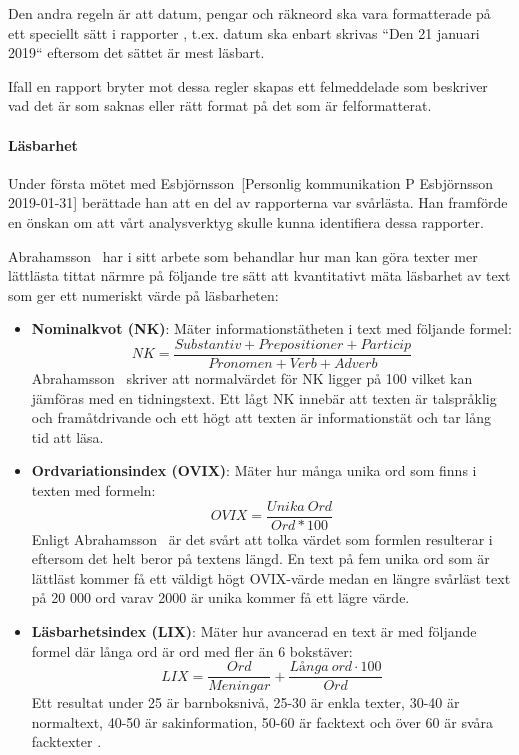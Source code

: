 \documentclass[swedish]{maucsthesis}
\begin{document}
Den andra regeln är att datum, pengar och räkneord ska vara formatterade på
ett speciellt sätt i rapporter \cite{rfsip}, t.ex. datum ska enbart 
skrivas ``Den 21 januari 2019`` eftersom det sättet är mest läsbart.

Ifall en rapport bryter mot dessa regler skapas ett felmeddelade som beskriver
vad det är som saknas eller rätt format på det som är felformatterat.

\paragraph*{Läsbarhet}\label{läsbarhet}

Under första mötet med Esbjörnsson~[Personlig kommunikation P Esbjörnsson 2019-01-31] berättade han att en del av
rapporterna var svårlästa. Han framförde en önskan om att vårt analysverktyg
skulle kunna identifiera dessa rapporter.

Abrahamsson~\cite{abrahamsson:2011} har i sitt arbete som behandlar hur man kan göra texter
mer lättlästa tittat närmre på följande tre sätt att kvantitativt mäta läsbarhet
av text som ger ett numeriskt värde på läsbarheten:

\begin{itemize}
\item \textbf{Nominalkvot (NK)}: Mäter informationstätheten i text med följande
  formel: $$NK=\frac{Substantiv + Prepositioner + Particip} {Pronomen + Verb + Adverb}$$
  Abrahamsson~\cite{abrahamsson:2011} skriver att normalvärdet för NK ligger på 100 vilket
  kan jämföras med en tidningstext. Ett lågt NK innebär att texten är
  talspråklig och framåtdrivande och ett högt att texten är informationstät och
  tar lång tid att läsa.
\item \textbf{Ordvariationsindex (OVIX)}: Mäter hur många unika ord som finns i
  texten med formeln: $$OVIX=\frac{Unika~Ord} {Ord *100}$$
  Enligt Abrahamsson~\cite{abrahamsson:2011} är
  det svårt att tolka värdet som formlen resulterar i eftersom det helt beror på
  textens längd. En text på fem unika ord som är lättläst kommer få ett väldigt
  högt OVIX-värde medan en längre svårläst text på 20 000 ord varav 2000 är
  unika kommer få ett lägre värde.
\item \textbf{Läsbarhetsindex (LIX)}: Mäter hur avancerad en text är med
  följande formel där långa ord är ord med fler än 6 bokstäver: 
  $$LIX=\frac{Ord}{Meningar} + \frac{L\text{å}nga~ord \cdot 100}{Ord}$$
  Ett resultat under 25 är barnboksnivå, 25-30 är
  enkla texter, 30-40 är normaltext, 40-50 är sakinformation, 50-60 är facktext
  och över 60 är svåra facktexter \cite{abrahamsson:2011}.
\end{itemize}
\end{document}

